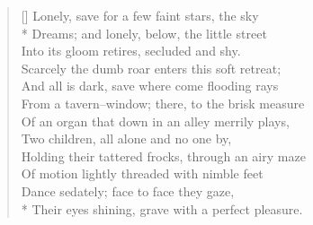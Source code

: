 \documentclass[MAIN]{subfiles}
\begin{document}
\settowidth{\versewidth}{Holding their tattered frocks, through an airy maze}
\begin{verse}[\versewidth]
Lonely, save for a few faint stars, the sky\\*
Dreams; and lonely, below, the little street\\
Into its gloom retires, secluded and shy.\\
Scarcely the dumb roar enters this soft retreat;\\
And all is dark, save where come flooding rays\\
From a tavern--window; there, to the brisk measure\\
Of an organ that down in an alley merrily plays,\\
Two children, all alone and no one by,\\
Holding their tattered frocks, through an airy maze\\
Of motion lightly threaded with nimble feet\\
Dance sedately; face to face they gaze,\\*
Their eyes shining, grave with a perfect pleasure.
\end{verse}
\end{document}
